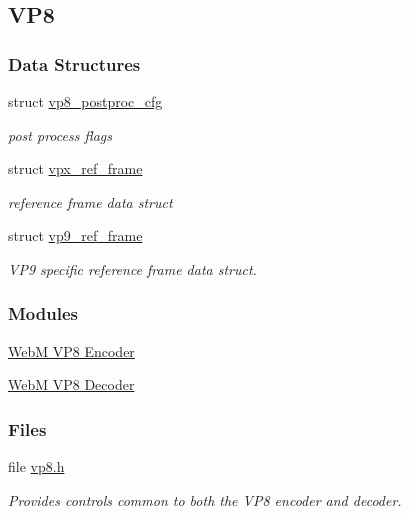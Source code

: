 \hypertarget{group__vp8}{\subsection{\-V\-P8}
\label{group__vp8}
}
\subsubsection*{\-Data \-Structures}
\begin{DoxyCompactItemize}
\item 
struct \hyperlink{structvp8__postproc__cfg}{vp8\-\_\-postproc\-\_\-cfg}
\begin{DoxyCompactList}\small\item\em post process flags \end{DoxyCompactList}\item 
struct \hyperlink{structvpx__ref__frame}{vpx\-\_\-ref\-\_\-frame}
\begin{DoxyCompactList}\small\item\em reference frame data struct \end{DoxyCompactList}\item 
struct \hyperlink{structvp9__ref__frame}{vp9\-\_\-ref\-\_\-frame}
\begin{DoxyCompactList}\small\item\em \-V\-P9 specific reference frame data struct. \end{DoxyCompactList}\end{DoxyCompactItemize}
\subsubsection*{\-Modules}
\begin{DoxyCompactItemize}
\item 
\hyperlink{group__vp8__encoder}{\-Web\-M V\-P8 Encoder}
\item 
\hyperlink{group__vp8__decoder}{\-Web\-M V\-P8 Decoder}
\end{DoxyCompactItemize}
\subsubsection*{\-Files}
\begin{DoxyCompactItemize}
\item 
file \hyperlink{vp8_8h}{vp8.\-h}
\begin{DoxyCompactList}\small\item\em \-Provides controls common to both the \-V\-P8 encoder and decoder. \end{DoxyCompactList}\end{DoxyCompactItemize}
